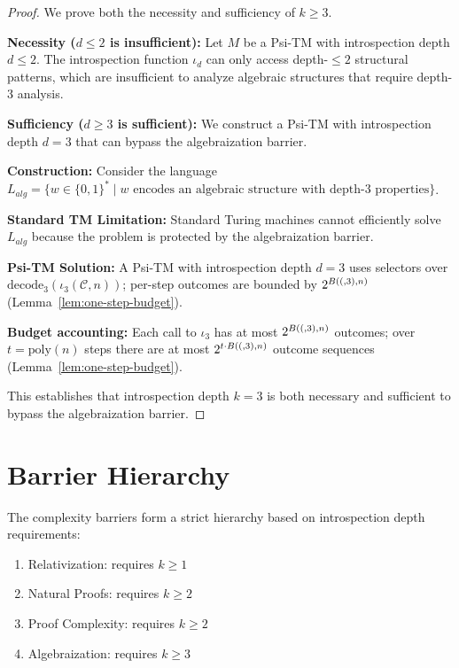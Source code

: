 \begin{proof}
We prove both the necessity and sufficiency of $k \geq 3$.

\textbf{Necessity ($d \le 2$ is insufficient):}
Let $M$ be a Psi-TM with introspection depth $d \leq 2$. The introspection function $\iota_d$ can only access depth-$\leq 2$ structural patterns, which are insufficient to analyze algebraic structures that require depth-3 analysis.

\textbf{Sufficiency ($d \ge 3$ is sufficient):}
We construct a Psi-TM with introspection depth $d = 3$ that can bypass the algebraization barrier.

\textbf{Construction:}
Consider the language $L_{alg} = \{w \in \{0,1\}^* \mid w \text{ encodes an algebraic structure with depth-3 properties}\}$.

\textbf{Standard TM Limitation:}
Standard Turing machines cannot efficiently solve $L_{alg}$ because the problem is protected by the algebraization barrier.

\textbf{Psi-TM Solution:}
A Psi-TM with introspection depth $d = 3$ uses selectors over $\mathrm{decode}_3(\iota_3(\mathcal{C},n))$; per-step outcomes are bounded by $2^{B((,3),n)}$ (Lemma~\ref{lem:one-step-budget}).

\textbf{Budget accounting:}
Each call to $\iota_3$ has at most $2^{B((,3),n)}$ outcomes; over $t=\mathrm{poly}(n)$ steps there are at most $2^{t\cdot B((,3),n)}$ outcome sequences (Lemma~\ref{lem:one-step-budget}).

This establishes that introspection depth $k = 3$ is both necessary and sufficient to bypass the algebraization barrier.
\end{proof}

\section{Barrier Hierarchy}

\begin{theorem}
The complexity barriers form a strict hierarchy based on introspection depth requirements:
\begin{enumerate}
\item Relativization: requires $k \geq 1$
\item Natural Proofs: requires $k \geq 2$
\item Proof Complexity: requires $k \geq 2$
\item Algebraization: requires $k \geq 3$
\end{enumerate}
\end{theorem}

